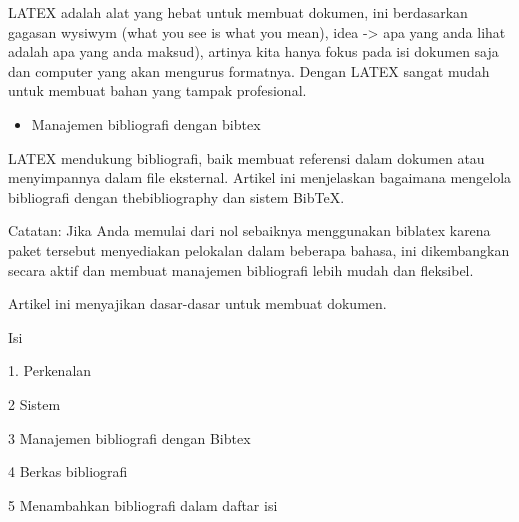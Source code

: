 \begin{itemize}
LATEX adalah alat yang hebat untuk membuat dokumen, ini berdasarkan gagasan wysiwym (what you see is what you mean), idea -> apa yang anda lihat adalah apa yang anda maksud), artinya kita hanya fokus pada isi dokumen saja dan computer yang akan mengurus formatnya. Dengan LATEX sangat mudah untuk membuat bahan yang tampak profesional. \par

\begin{itemize}
	\item Manajemen bibliografi dengan bibtex
\end{itemize}\par


\noindent LATEX mendukung bibliografi, baik membuat referensi dalam dokumen atau menyimpannya dalam file eksternal. Artikel ini menjelaskan bagaimana mengelola bibliografi dengan thebibliography dan sistem BibTeX.\par

\vspace{\baselineskip}
\noindent Catatan: Jika Anda memulai dari nol sebaiknya menggunakan biblatex karena paket tersebut menyediakan pelokalan dalam beberapa bahasa, ini dikembangkan secara aktif dan membuat manajemen bibliografi lebih mudah dan fleksibel.\par

\vspace{\baselineskip}
\noindent Artikel ini menyajikan dasar-dasar untuk membuat dokumen.\par
\vspace{\baselineskip}

\noindent \hspace*{0.5in}Isi\par


\noindent \hspace*{0.5in}1. Perkenalan\par


\noindent \hspace*{0.5in}2 Sistem\par


\noindent \hspace*{0.5in}3 Manajemen bibliografi dengan Bibtex\par


\noindent \hspace*{0.5in}4 Berkas bibliografi\par


\noindent \hspace*{0.5in}5 Menambahkan bibliografi dalam daftar isi\par



\end{itemize}
